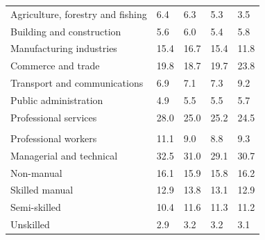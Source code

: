 \documentclass{article}
\begin{document}
\begin{table}[h]
\begin{tabular}{KTTTT}
    \hline
Agriculture, forestry and fishing  & 6.4& 6.3& 5.3& 3.5\\
Building and construction & 5.6& 6.0& 5.4& 5.8\\
Manufacturing industries & 15.4& 16.7& 15.4& 11.8\\
Commerce and trade  & 19.8& 18.7& 19.7& 23.8\\
Transport and communications  & 6.9& 7.1& 7.3& 9.2\\
Public administration & 4.9& 5.5& 5.5& 5.7\\
Professional services & 28.0& 25.0& 25.2& 24.5\\
\hline
    \\ 
    \hline
Professional workers  & 11.1&  9.0 &  8.8&  9.3\\
Managerial and technical & 32.5& 31.0& 29.1& 30.7\\
Non-manual & 16.1& 15.9& 15.8& 16.2\\
Skilled manual & 12.9& 13.8& 13.1& 12.9\\
Semi-skilled & 10.4& 11.6& 11.3& 11.2\\
Unskilled  & 2.9& 3.2& 3.2& 3.1\\
\end{tabular}
\end{table}
\pagebreak
\end{document}
